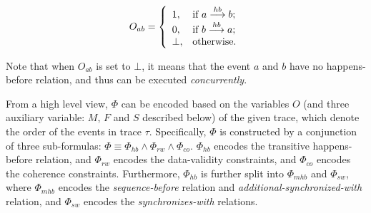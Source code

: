 \documentclass[preprint, numbers, 10pt]{sigplanconf}
\begin{document}
\[ O_{ab} = \left\{
  \begin{array}{l l}
    1,           &  {\text{if $a \stackrel{hb}{\longrightarrow} b$}};\\
    0,           &  {\text{if $b \stackrel{hb}{\longrightarrow} a$}};\\
    \bot,  &  \text{otherwise}.
  \end{array} \right.\]

Note that when $O_{ab}$ is set to $\bot$, it means that the event $a$ and $b$
have no happens-before relation, and thus can be executed \textit{concurrently}.   


From a high level view, $\Phi$ can be encoded based on the variables $O$
(and three auxiliary variable: $M$, $F$ and $S$ described below) of the given trace, 
which denote the order of the events in trace $\tau$. 
Specifically, $\Phi$ is constructed by a 
conjunction of three sub-formulas: $\Phi\equiv\Phi_{hb}\wedge\Phi_{rw}\wedge\Phi_{co}$.
$\Phi_{hb}$ encodes the transitive happens-before relation, 
and $\Phi_{rw}$ encodes the data-validity constraints, %
and $\Phi_{co}$ encodes the coherence constraints. 
Furthermore, $\Phi_{hb}$ is further split into $\Phi_{mhb}$ and $\Phi_{sw}$, where 
$\Phi_{mhb}$ encodes the \textit{sequence-before} relation and \textit{additional-synchronized-with} relation,
and $\Phi_{sw}$ encodes the \textit{synchronizes-with} relations. 

\end{document}
